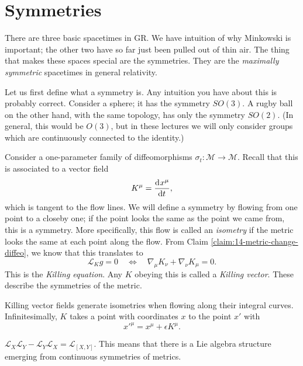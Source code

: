 \section{Symmetries}%
\label{sec:symmetries}

There are three basic spacetimes in GR.
We have intuition of why Minkowski is important; the other two have so far just been pulled out of thin air. The thing that makes these spaces special are the symmetries.
They are the \emph{maximally symmetric} spacetimes in general relativity.

Let us first define what a symmetry is.
Any intuition you have about this is probably correct. 
Consider a sphere; it has the symmetry $SO(3)$. A rugby ball on the other hand, with the same topology, has only the symmetry $SO(2)$.
(In general, this would be $O(3)$, but in these lectures we will only consider groups which are continuously connected to the identity.)

Consider a one-parameter family of diffeomorphisms $\sigma_t \colon \mathcal{M} \to \mathcal{M}$.
Recall that this is associated to a vector field
\begin{equation}
  K^{\mu} = \dv[]{x^{\mu}}{t},
\end{equation}
which is tangent to the flow lines.
We will define a symmetry by flowing from one point to a closeby one; if the point looks the same as the point we came from, this is a symmetry.
More specifically, this flow is called an \emph{isometry} if the metric looks the same at each point along the flow.
From Claim \ref{claim:14-metric-change-diffeo}, we know that this translates to 
\begin{equation}
  \label{eq:killing}
  \mathcal{L}_K g = 0 \quad \iff \quad \nabla_{\mu} K_{\nu} + \nabla_{\nu} K_{\mu} = 0.
\end{equation}
This is the \emph{Killing equation}. Any $K$ obeying this is called a \emph{Killing vector}. These describe the symmetries of the metric.

Killing vector fields generate isometries when flowing along their integral curves. Infinitesimally, $K$ takes a point with coordinates $x$ to the point $x'$ with
\begin{equation}
  x'^{\mu} = x^{\mu} + \epsilon K^{\mu}.
\end{equation}

\begin{leftbar}
  \begin{remark}
    $\mathcal{L}_X \mathcal{L}_Y - \mathcal{L}_Y \mathcal{L}_X = \mathcal{L}_{[X, Y]}$.
    This means that there is a Lie algebra structure emerging from continuous symmetries of metrics.
  \end{remark}
\end{leftbar}

